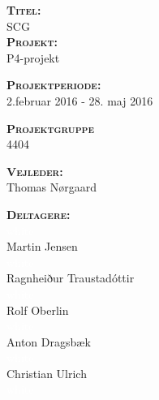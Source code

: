  \begin{minipage}[t]{0.48\textwidth}
 \textsc{\textbf{Titel:}} \\[5pt]\bigskip\hspace{2ex}
SCG\\  


\noindent  \textsc{\textbf{Projekt:}}\\[5pt]\bigskip\hspace{2ex}
P4-projekt

\noindent  \textsc{\textbf{Projektperiode:}} \\[5pt]\bigskip\hspace{2ex}
2.februar 2016 - 28. maj 2016

\noindent  \textsc{\textbf{Projektgruppe}} \\[5pt]\bigskip\hspace{2ex}
4404

\noindent  \textsc{\textbf{Vejleder:}} \\[5pt]\hspace*{2ex}
Thomas Nørgaard \\\bigskip\hspace{2ex}


\noindent  \textsc{\textbf{Deltagere:}} \\[5pt]\hspace*{2ex}
\textcolor{white}{white}\\\hspace*{2ex}
Martin Jensen \\\hspace*{2ex} 
\textcolor{white}{white}\\\hspace*{2ex}
Ragnheiður Traustadóttir\\\hspace*{2ex}
\textcolor{white}{white}\\\hspace*{2ex}
 Rolf Oberlin \\\hspace*{2ex}
\textcolor{white}{white}\\\hspace*{2ex}
Anton Dragsbæk \\\hspace*{2ex}
\textcolor{white}{white}\\\hspace*{2ex}
 Christian Ulrich\\\hspace*{2ex}
\textcolor{white}{white}\\\hspace*{2ex}






\vspace*{1cm}

\end{minipage}
